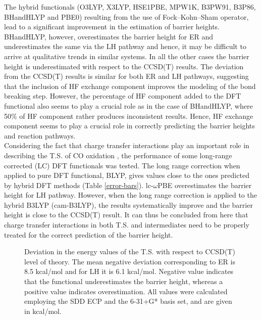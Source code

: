 The hybrid functionals (O3LYP, X3LYP, HSE1PBE, MPW1K, B3PW91, B3P86, BHandHLYP and PBE0) resulting from the use of Fock--Kohn--Sham operator, lead to a significant improvement in the estimation of barrier heights. BHandHLYP, however, overestimates the barrier height for ER and underestimates the same via the LH pathway and hence, it may be difficult to arrive at qualitative trends in similar systems. In all the other cases the barrier height is underestimated with respect to the CCSD(T) results. The deviation from the CCSD(T) results is similar for both ER and LH pathways, suggesting that the inclusion of HF exchange component improves the modeling of the bond breaking step. However, the percentage of HF component added to the DFT functional also seems to play a crucial role as in the case of BHandHLYP, where 50$\% $ of HF component rather produces inconsistent results. Hence, HF exchange component seems to play a crucial role in correctly predicting the barrier heights and reaction pathways. \\
Considering the fact that charge transfer interactions play an important role in describing the T.S. of CO oxidation \cite{Olga2010,ping2010}, the performance of some long-range corrected (LC) DFT functionals was tested. The long range correction when applied to pure DFT functional, BLYP, gives values close to the ones predicted by hybrid DFT methods (Table \ref{error-bars}). lc-$\omega$PBE overestimates the barrier height for LH pathway. However, when the long range correction is applied to the hybrid B3LYP (cam-B3LYP), the results systematically improve and the barrier height is close to the CCSD(T) result. It can thus be concluded from here that charge transfer interactions in both T.S. and intermediates need to be properly treated for the correct prediction of the barrier height. \\
\begin{figure}[!t] 
            \centering
\caption{Deviation in the energy values of the T.S. with respect to CCSD(T) level of theory. The mean negative deviation corresponding to ER is 8.5 kcal/mol and for LH it is 6.1 kcal/mol. Negative value indicates that the functional underestimates the barrier height, whereas a positive value indicates overestimation. All values were calculated employing the SDD ECP and the 6-31+G* basis set, and are given in kcal/mol.} \label{CCSDT-Diff}
\end{figure}
